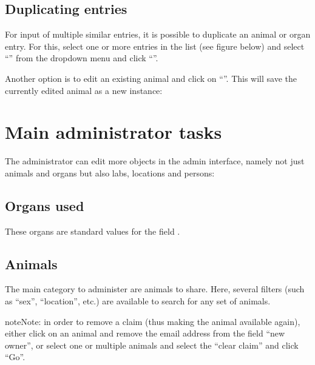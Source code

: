 \documentclass[letterpaper,10pt,openany,oneside,english]{sphinxmanual}
\begin{document}
\subsection{Duplicating entries}
\label{\detokenize{index:duplicating-entries}}
For input of multiple similar entries, it is possible to duplicate an animal or organ entry. For this, select one
or more entries in the list (see figure below) and select “” from the dropdown menu and click
“”.

\noindent{}

Another option is to edit an existing animal and click on “”. This will save the
currently edited animal as a new instance:

\noindent{}


\section{Main administrator tasks}
\label{\detokenize{index:main-administrator-tasks}}
The administrator can edit more objects in the admin interface, namely not just animals and organs
but also labs, locations and persons:

\noindent{}


\subsection{Organs used}
\label{\detokenize{index:organs-used}}
These organs are standard values for the field .


\subsection{Animals}
\label{\detokenize{index:id5}}
The main category to administer are animals to share.
Here, several filters (such as “sex”, “location”, etc.) are available to search for any set of animals.

\noindent{}

\begin{sphinxadmonition}{note}{Note:}
in order to remove a claim (thus making the animal available again), either click on an animal
and remove the email address from the field “new owner”, or select one or multiple animals and
select the “clear claim”  and click “Go”.
\end{sphinxadmonition}
\end{document}

